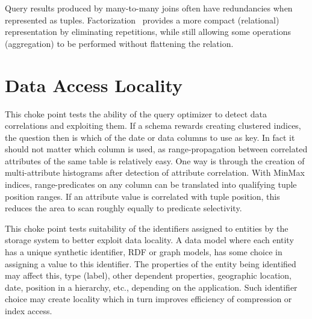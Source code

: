 


Query results produced by many-to-many joins often have redundancies when represented as tuples.
Factorization~\cite{DBLP:journals/sigmod/OlteanuS16} provides a more compact (relational) representation by eliminating repetitions,
while still allowing some operations (\eg aggregation) to be performed without flattening the relation.




\section{Data Access Locality}



This choke point tests the ability of the query optimizer to detect data correlations and exploiting them. If a schema rewards creating clustered indices, the question then is which of the date or data columns to use as key.
In fact it should not matter which column is used, as range-propagation between correlated attributes of the same table is relatively easy. One way is through the creation of multi-attribute histograms after detection of attribute correlation.
With MinMax indices, range-predicates on any column can be translated into qualifying tuple position ranges. If an attribute value is correlated with tuple position, this reduces the area to scan roughly equally to predicate selectivity.





This choke point tests suitability of the identifiers assigned to entities by the storage system to better exploit data locality. A data model where each entity has a unique synthetic identifier,
\eg RDF or graph models, has some choice in assigning a value to this identifier.
The properties of the entity being identified may affect this, \eg type (label), other dependent properties,
\eg geographic location, date, position in a hierarchy, etc., depending on the application. Such identifier choice may create locality which in turn improves efficiency of compression or index access.

